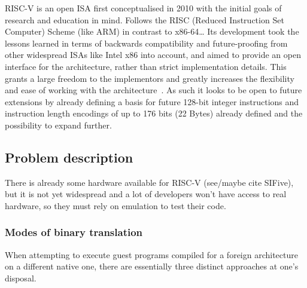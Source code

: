 RISC-V is an open ISA first conceptualised in 2010 with the initial goals of research and education in mind.
Follows the RISC (Reduced Instruction Set Computer) Scheme (like ARM) in contrast to x86-64\ldots
Its development took the lessons learned in terms of backwards compatibility and future-proofing from other widespread ISAs like Intel x86 into account, and aimed to provide an open interface for the architecture, rather than strict implementation details.
This grants a large freedom to the implementors and greatly increases the flexibility and ease of working with the architecture~\cite[S. 1f]{riscvspec}.
As such it looks to be open to future extensions by already defining a basis for future 128-bit integer instructions and instruction length encodings of up to 176 bits (22 Bytes) already defined and the possibility to expand further.


\subsection{Problem description}
There is already some hardware available for RISC-V (see/maybe cite SIFive), but it is not yet widespread and a lot of developers won't have access to real hardware, so they must rely on emulation to test their code.

\subsubsection{Modes of binary translation}
When attempting to execute guest programs compiled for a foreign architecture on a different native one, there are essentially three distinct approaches at one's disposal.

